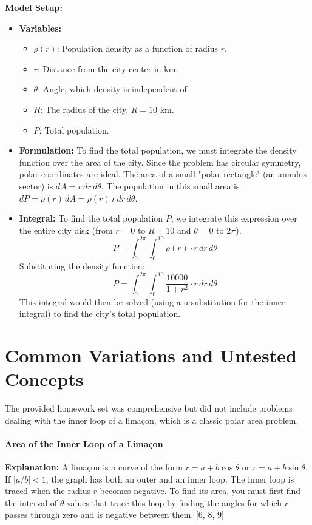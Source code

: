 \documentclass{article}
\begin{document}
\textbf{Model Setup:}
\begin{itemize}
    \item \textbf{Variables:}
        \begin{itemize}
            \item $\rho(r)$: Population density as a function of radius $r$.
            \item $r$: Distance from the city center in km.
            \item $\theta$: Angle, which density is independent of.
            \item $R$: The radius of the city, $R=10$ km.
            \item $P$: Total population.
        \end{itemize}
    \item \textbf{Formulation:} To find the total population, we must integrate the density function over the area of the city. Since the problem has circular symmetry, polar coordinates are ideal. The area of a small "polar rectangle" (an annulus sector) is $dA = r \, dr \, d\theta$. The population in this small area is $dP = \rho(r) \, dA = \rho(r) \, r \, dr \, d\theta$.
    \item \textbf{Integral:} To find the total population $P$, we integrate this expression over the entire city disk (from $r=0$ to $R=10$ and $\theta=0$ to $2\pi$).
    \[ P = \int_{0}^{2\pi} \int_{0}^{10} \rho(r) \cdot r \, dr \, d\theta \]
    Substituting the density function:
    \[ P = \int_{0}^{2\pi} \int_{0}^{10} \frac{10000}{1 + r^2} \cdot r \, dr \, d\theta \]
    This integral would then be solved (using a u-substitution for the inner integral) to find the city's total population.
\end{itemize}

\part{Common Variations and Untested Concepts}
The provided homework set was comprehensive but did not include problems dealing with the inner loop of a limaçon, which is a classic polar area problem.

\subsection{Area of the Inner Loop of a Limaçon}
\textbf{Explanation:} A limaçon is a curve of the form $r = a + b\cos\theta$ or $r = a + b\sin\theta$. If $|a/b| < 1$, the graph has both an outer and an inner loop. The inner loop is traced when the radius $r$ becomes negative. To find its area, you must first find the interval of $\theta$ values that trace this loop by finding the angles for which $r$ passes through zero and is negative between them. [6, 8, 9]
\end{document}
